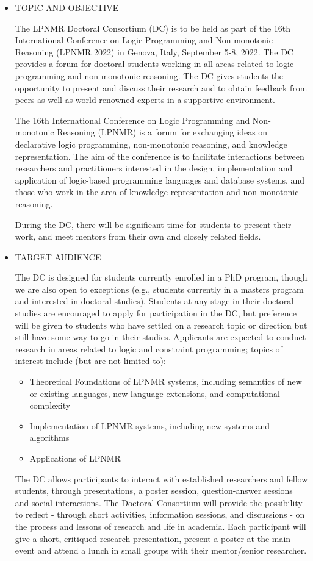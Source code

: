 \documentclass[prodmode,acmtecs]{acmsmall} %
\begin{document}
\begin{itemize}\item  TOPIC AND OBJECTIVE  
 
  The LPNMR Doctoral Consortium (DC) is to be held as part of the 16th International Conference on Logic Programming and Non-monotonic Reasoning (LPNMR 2022) in Genova, Italy, September 5-8, 2022. The DC provides a forum for doctoral students working in all areas related to logic programming and non-monotonic reasoning. The DC gives students the opportunity to present and discuss their research and to obtain feedback from peers as well as world-renowned experts in a supportive environment. 
 
  The 16th International Conference on Logic Programming and Non-monotonic Reasoning (LPNMR) is a forum for exchanging ideas on declarative logic programming, non-monotonic reasoning, and knowledge representation. The aim of the conference is to facilitate interactions between researchers and practitioners interested in the design, implementation and application of logic-based programming languages and database systems, and those who work in the area of knowledge representation and non-monotonic reasoning. 
 
  During the DC, there will be significant time for students to present their work, and meet mentors from their own and closely related fields. 
 
\item  TARGET AUDIENCE 
 
  The DC is designed for students currently enrolled in a PhD program, though we are also open to exceptions (e.g., students currently in a masters program and interested in doctoral studies). Students at any stage in their doctoral studies are encouraged to apply for participation in the DC, but preference will be given to students who have settled on a research topic or direction but still have some way to go in their studies. Applicants are expected to conduct research in areas related to logic and constraint programming; topics of interest include (but are not limited to): 
 
\begin{itemize}\item  Theoretical Foundations of LPNMR systems, including semantics of new or existing languages, new language extensions, and computational complexity
\item  Implementation of LPNMR systems, including new systems and algorithms
\item  Applications of LPNMR
\end{itemize} 
   The DC allows participants to interact with established researchers and fellow students, through presentations, a poster session, question-answer sessions and social interactions. The Doctoral Consortium will provide the possibility to reflect - through short activities, information sessions, and discussions - on the process and lessons of research and life in academia. Each participant will give a short, critiqued research presentation, present a poster at the main event and attend a lunch in small groups with their mentor/senior researcher. 
 

\end{itemize}
\end{document}
